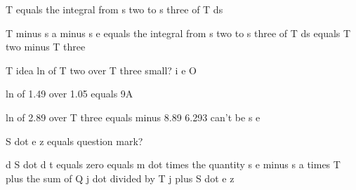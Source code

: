T equals the integral from s two to s three of T ds

T minus s a minus s e equals the integral from s two to s three of T ds equals T two minus T three

T idea ln of T two over T three small? i e O

ln of 1.49 over 1.05 equals 9A

ln of 2.89 over T three equals minus 8.89 6.293 can't be s e

S dot e z equals question mark?  

d S dot d t equals zero equals m dot times the quantity s e minus s a times T plus the sum of Q j dot divided by T j plus S dot e z